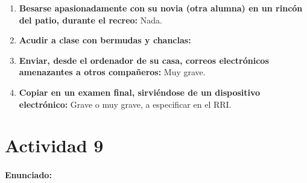 {\begin{enumerate}
	\item \textbf{Besarse apasionadamente con su novia (otra alumna) en un rincón del patio, durante el recreo: } Nada.

	\item \textbf{Acudir a clase con bermudas y chanclas: } 
	\item \textbf{Enviar, desde el ordenador de su casa, correos electrónicos amenazantes a otros compañeros: } Muy grave.

	\item \textbf{Copiar en un examen final, sirviéndose de un dispositivo electrónico: } Grave o muy grave, a especificar en el RRI.

\end{enumerate}


\newpage
\section*{Actividad 9}
\paragraph{Enunciado: }

}
